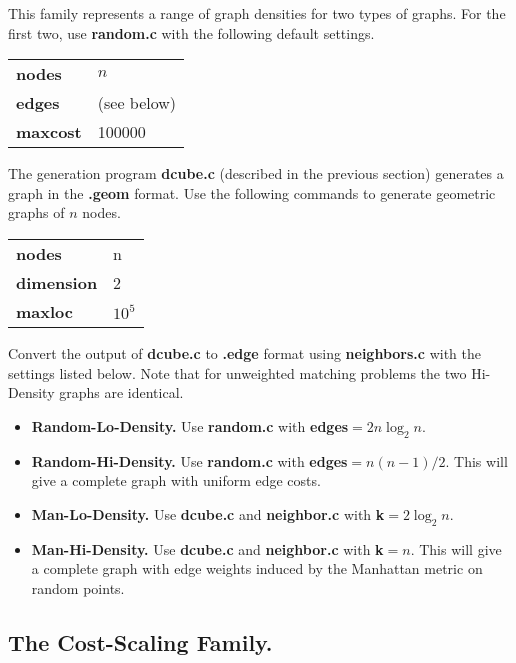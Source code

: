 This family represents a range of graph densities for two 
types of graphs.  For the first
two, use {\bf random.c} with the following default settings. 

\begin{tabular}{ll}
{\bf nodes} & $n$ 
\\ {\bf edges} & (see below) 
\\ {\bf maxcost} &
100000 \\
\end{tabular} 

\vspace{.2in} 
The generation program {\bf dcube.c} (described in the previous 
section) generates a graph in the {\bf .geom} format. 
Use the following commands to generate geometric
graphs of $n$ nodes.

\begin{tabular}{ll}
{\bf nodes } & n \\ 
{\bf dimension} & 2 \\ 
{\bf maxloc} & $10^5$ \\
\end{tabular} 

Convert the output of {\bf dcube.c}  to {\bf .edge} format 
using {\bf neighbors.c} with the settings listed below. 
Note that for unweighted matching problems the two Hi-Density graphs are
identical. 

\begin{itemize}
\item {\bf Random-Lo-Density.} Use {\bf random.c} with 
{\bf edges}$= 2n \log_2 n$.

\item {\bf Random-Hi-Density.} Use {\bf random.c} with
{\bf edges}$=n(n-1)/2$.  This will give a complete graph with uniform
edge costs.

\item {\bf Man-Lo-Density.} Use {\bf dcube.c} and
{\bf neighbor.c} with {\bf k}$= 2 \log_2 n$.

\item {\bf Man-Hi-Density.} Use {\bf dcube.c} and
{\bf neighbor.c} with {\bf k}$=n$. This will give a complete graph
with edge weights induced by the Manhattan metric on random points.

\end{itemize} 

\subsection{The Cost-Scaling Family.} 

